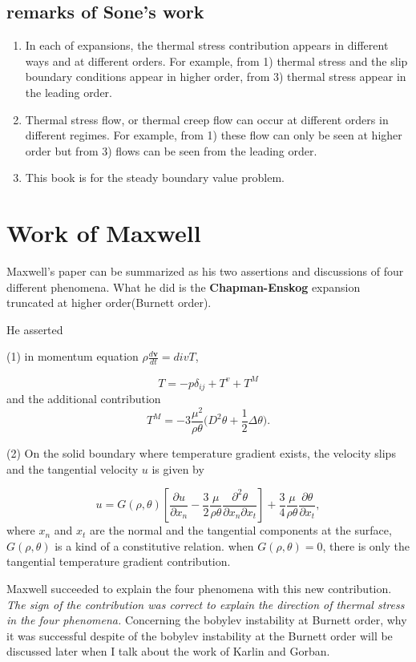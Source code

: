 \documentclass[a4paper,12pt]{article}
\begin{document}
\subsection{remarks of Sone's work}
\begin{enumerate}
 \item In each of expansions, the thermal stress contribution appears in different ways and at different orders. For example, from 1) thermal stress and the slip boundary conditions appear in higher order, from 3) thermal stress appear in the leading order.
 \item Thermal stress flow, or thermal creep flow can occur at different orders in different regimes. For example, from 1) these flow can only be seen at higher order but from 3) flows can be seen from the leading order.
 \item This book is for the steady boundary value problem.
\end{enumerate}


\section{Work of Maxwell}
Maxwell's paper can be summarized as his two assertions and discussions of four different phenomena. What he did is the {\bf Chapman-Enskog} expansion truncated at higher order(Burnett order).

He asserted

 (1) in momentum equation $ \rho \frac{d\mathbf{v}}{dt} = div{T} $,

{{{$$ T = -p \delta_{ij} + T^v + T^M$$}}} and the additional contribution {{{$$T^M = -3\frac{\mu^2}{\rho\theta} \big( D^2 \theta + \frac{1}{2}\Delta \theta\big).$$}}}

 (2) On the solid boundary where temperature gradient exists, the velocity slips and the tangential velocity $u$ is given by

{{{ $$u = G(\rho,\theta) \left[ \frac{\partial u}{\partial x_n} - \frac{3}{2} \frac{\mu}{\rho\theta} \frac{\partial^2\theta}{\partial x_n\partial x_t}\right]  + \frac{3}{4} \frac{\mu}{\rho\theta} \frac{\partial\theta}{\partial x_t},$$ }}}
where $x_n$ and $x_t$ are the normal and the tangential components at the surface, $G(\rho,\theta)$ is a kind of a constitutive relation.
when $G(\rho,\theta)=0$, there is only the tangential temperature gradient contribution.

Maxwell succeeded to explain  the four phenomena with this new contribution. {\it The sign of the contribution was correct to explain the direction of thermal stress in the four phenomena.}  Concerning the bobylev instability at Burnett order, why it was successful despite of the bobylev instability at the Burnett order will be discussed later when I talk about the work of Karlin and Gorban.
\end{document}
